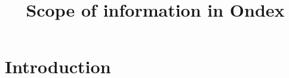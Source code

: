 \documentclass[a4paper,10pt]{article}
\title{Scope of information in Ondex}
\begin{document}
\maketitle

\section{Introduction}
\end{document}
